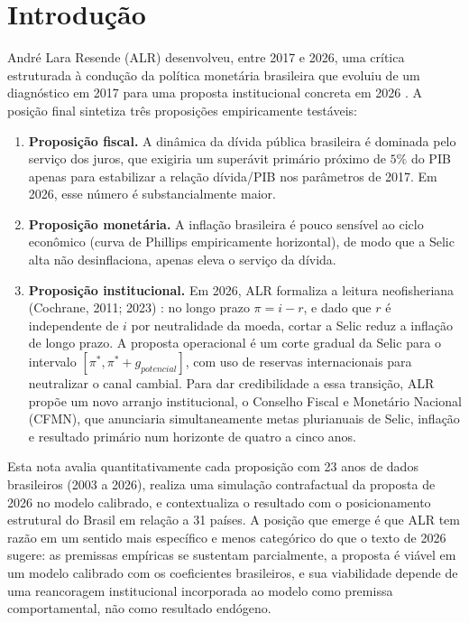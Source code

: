 \documentclass[11pt,a4paper]{article}
\begin{document}
\section{Introdução}

André Lara Resende (ALR) desenvolveu, entre 2017 e 2026, uma crítica
estruturada à condução da política monetária brasileira que evoluiu de um
diagnóstico em 2017 \cite{lararesende2017} para uma proposta
institucional concreta em 2026 \cite{lararesende2026}. A posição final
sintetiza três proposições empiricamente testáveis:

\begin{enumerate}[leftmargin=2em,topsep=0.3em]
  \item \textbf{Proposição fiscal.} A dinâmica da dívida pública brasileira
    é dominada pelo serviço dos juros, que exigiria um superávit primário
    próximo de $5\%$ do PIB apenas para estabilizar a relação dívida/PIB
    nos parâmetros de 2017. Em 2026, esse número é substancialmente maior.
  \item \textbf{Proposição monetária.} A inflação brasileira é pouco sensível
    ao ciclo econômico (curva de Phillips empiricamente horizontal), de modo
    que a Selic alta não desinflaciona, apenas eleva o serviço da dívida.
  \item \textbf{Proposição institucional.} Em 2026, ALR formaliza a leitura
    neofisheriana (Cochrane, 2011; 2023) \cite{cochrane2011,cochrane2023}:
    no longo prazo $\pi = i - r$, e dado que $r$ é independente de $i$
    por neutralidade da moeda, cortar a Selic reduz a inflação de
    longo prazo. A proposta operacional é um corte gradual da Selic
    para o intervalo $[\pi^*, \pi^* + g_{potencial}]$, com uso de reservas
    internacionais para neutralizar o canal cambial. Para dar credibilidade
    a essa transição, ALR propõe um novo arranjo institucional, o
    Conselho Fiscal e Monetário Nacional (CFMN), que anunciaria
    simultaneamente metas plurianuais de Selic, inflação e resultado
    primário num horizonte de quatro a cinco anos.
\end{enumerate}

Esta nota avalia quantitativamente cada proposição com 23 anos de dados
brasileiros (2003 a 2026), realiza uma simulação contrafactual da proposta
de 2026 no modelo calibrado, e contextualiza o resultado com o posicionamento
estrutural do Brasil em relação a 31 países. A posição que emerge é que ALR
tem razão em um sentido mais específico e menos categórico do que o
texto de 2026 sugere: as premissas empíricas se sustentam parcialmente, a
proposta é viável em um modelo calibrado com os coeficientes brasileiros,
e sua viabilidade depende de uma reancoragem institucional incorporada ao
modelo como premissa comportamental, não como resultado endógeno.
\end{document}
